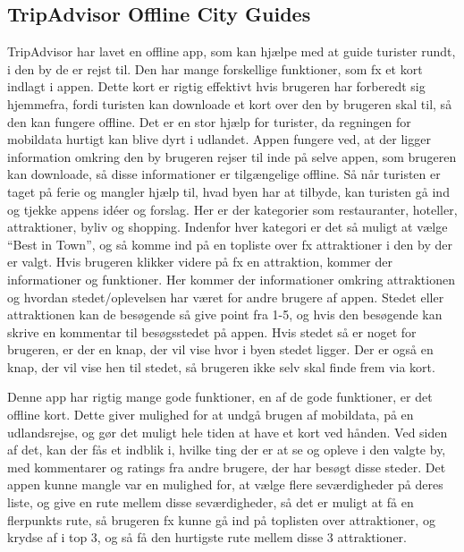 \subsection{TripAdvisor Offline City Guides}
TripAdvisor har lavet en offline app, som kan hjælpe med at guide turister rundt, i den by de er rejst til. Den har mange forskellige funktioner, som fx et kort indlagt i appen. Dette kort er rigtig effektivt hvis brugeren har forberedt sig hjemmefra, fordi turisten kan downloade et kort over den by brugeren skal til, så den kan fungere offline. Det er en stor hjælp for turister, da regningen for mobildata hurtigt kan blive dyrt i udlandet\citep {TDC}. \newline
Appen fungere ved, at der ligger information omkring den by brugeren rejser til inde på selve appen, som brugeren kan downloade, så disse informationer er tilgængelige offline. Så når turisten er taget på ferie og mangler hjælp til, hvad byen har at tilbyde, kan turisten gå ind og tjekke appens idéer og forslag. Her er der kategorier som restauranter, hoteller, attraktioner, byliv og shopping. Indenfor hver kategori er det så muligt at vælge “Best in Town”, og så komme ind på en topliste over fx attraktioner i den by der er valgt.\newline
Hvis brugeren klikker videre på fx en attraktion, kommer der informationer og funktioner. Her kommer der informationer omkring attraktionen og hvordan stedet/oplevelsen har været for andre brugere af appen. Stedet eller attraktionen kan de besøgende så give point fra 1-5, og hvis den besøgende kan skrive en kommentar til besøgsstedet på appen. Hvis stedet så er noget for brugeren, er der en knap, der vil vise hvor i byen stedet ligger. Der er også en knap, der vil vise hen til stedet, så brugeren ikke selv skal finde frem via kort.\newline

Denne app har rigtig mange gode funktioner, en af de gode funktioner, er det offline kort. Dette giver mulighed for at undgå brugen af mobildata, på en udlandsrejse, og gør det muligt hele tiden at have et kort ved hånden. Ved siden af det, kan der fås et indblik i, hvilke ting der er at se og opleve i den valgte by, med kommentarer og ratings fra andre brugere, der har besøgt disse steder.
Det appen kunne mangle var en mulighed for, at vælge flere seværdigheder på deres liste, og give en rute mellem disse seværdigheder, så det er muligt at få en flerpunkts rute, så brugeren fx kunne gå ind på toplisten over attraktioner, og krydse af i top 3, og så få den hurtigste rute mellem disse 3 attraktioner. 


